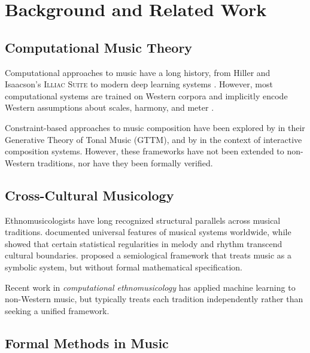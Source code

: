 \documentclass[cmj]{article}
\begin{document}
\section{Background and Related Work}
\label{sec:background}

\subsection{Computational Music Theory}

Computational approaches to music have a long history, from Hiller and
Isaacson's \textsc{Illiac Suite} \citep{hiller1959musical} to modern deep
learning systems \citep{dhariwal2020jukebox,roberts2018hierarchical}. However,
most computational systems are trained on Western corpora and implicitly encode
Western assumptions about scales, harmony, and meter
\citep{huron2006sweet}.

Constraint-based approaches to music composition have been explored by
\citet{lerdahl1983generative} in their Generative Theory of Tonal Music (GTTM),
and by \citet{pachet1999constrained} in the context of interactive
composition systems. However, these frameworks have not been extended to
non-Western traditions, nor have they been formally verified.

\subsection{Cross-Cultural Musicology}

Ethnomusicologists have long recognized structural parallels across musical
traditions. \citet{nettle2015contrasting} documented universal features of
musical systems worldwide, while \citet{savage2015structure} showed that
certain statistical regularities in melody and rhythm transcend cultural
boundaries. \citet{nattiez1990music} proposed a semiological framework that
treats music as a symbolic system, but without formal mathematical
specification.

Recent work in \emph{computational ethnomusicology} \citep{chordia2011
computational,srinivasamurthy2014augmented} has applied machine learning to
non-Western music, but typically treats each tradition independently rather
than seeking a unified framework.

\subsection{Formal Methods in Music}
\end{document}
